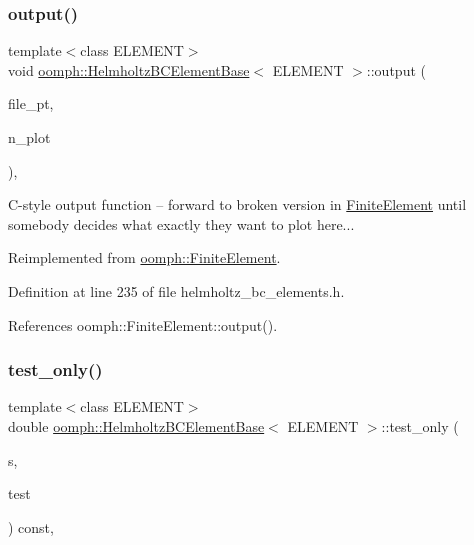 \subsubsection{\texorpdfstring{output()}{output()}\hspace{0.1cm}{\footnotesize\ttfamily [4/4]}}
{\footnotesize\ttfamily template$<$class E\+L\+E\+M\+E\+NT$>$ \\
void \hyperlink{classoomph_1_1HelmholtzBCElementBase}{oomph\+::\+Helmholtz\+B\+C\+Element\+Base}$<$ E\+L\+E\+M\+E\+NT $>$\+::output (\begin{DoxyParamCaption}\item[{F\+I\+LE $\ast$}]{file\+\_\+pt,  }\item[{const unsigned \&}]{n\+\_\+plot }\end{DoxyParamCaption})\hspace{0.3cm}{\ttfamily [inline]}, {\ttfamily [virtual]}}



C-\/style output function -- forward to broken version in \hyperlink{classoomph_1_1FiniteElement}{Finite\+Element} until somebody decides what exactly they want to plot here... 



Reimplemented from \hyperlink{classoomph_1_1FiniteElement_adfaee690bb0608f03320eeb9d110d48c}{oomph\+::\+Finite\+Element}.



Definition at line 235 of file helmholtz\+\_\+bc\+\_\+elements.\+h.



References oomph\+::\+Finite\+Element\+::output().

\mbox{\label{classoomph_1_1HelmholtzBCElementBase_a0ab124ee22e66e97013264cad6cc0c07}} 
\subsubsection{\texorpdfstring{test\+\_\+only()}{test\_only()}}
{\footnotesize\ttfamily template$<$class E\+L\+E\+M\+E\+NT$>$ \\
double \hyperlink{classoomph_1_1HelmholtzBCElementBase}{oomph\+::\+Helmholtz\+B\+C\+Element\+Base}$<$ E\+L\+E\+M\+E\+NT $>$\+::test\+\_\+only (\begin{DoxyParamCaption}\item[{const \hyperlink{classoomph_1_1Vector}{Vector}$<$ double $>$ \&}]{s,  }\item[{\hyperlink{classoomph_1_1Shape}{Shape} \&}]{test }\end{DoxyParamCaption}) const\hspace{0.3cm}{\ttfamily [inline]}, {\ttfamily [protected]}}



